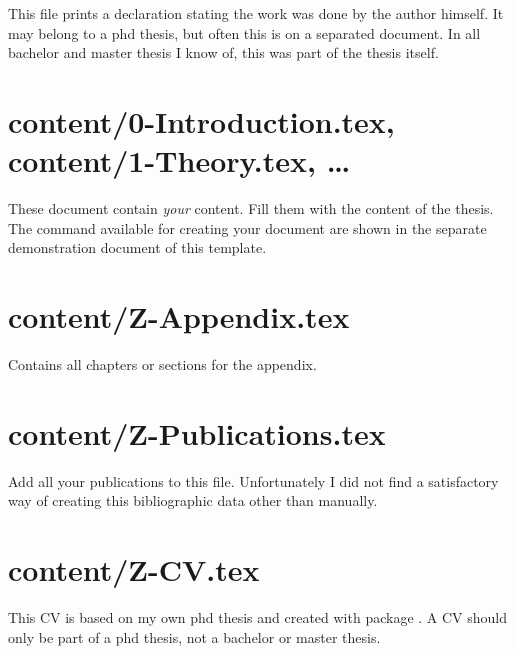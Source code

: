 This file prints a declaration stating the work was done by the author himself.
It may belong to a phd thesis, but often this is on a separated document. In all bachelor and master thesis I know of, this was part of the thesis itself.



\section{content/0-Introduction.tex, content/1-Theory.tex, \ldots}

These document contain \emph{your} content. Fill them with the content of the thesis. The command available for creating your document are shown in the separate demonstration document of this template.

\section{content/Z-Appendix.tex}

Contains all chapters or sections for the appendix.


\section{content/Z-Publications.tex}

Add all your publications to this file. Unfortunately I did not find a satisfactory way of creating this bibliographic data other than manually.


\section{content/Z-CV.tex}

This CV is based on my own phd thesis and created with package . A CV should only be part of a phd thesis, not a bachelor or master thesis.


